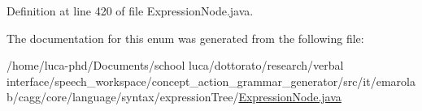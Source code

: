 Definition at line 420 of file Expression\-Node.\-java.



The documentation for this enum was generated from the following file\-:\begin{DoxyCompactItemize}
\item 
/home/luca-\/phd/\-Documents/school luca/dottorato/research/verbal interface/speech\-\_\-workspace/concept\-\_\-action\-\_\-grammar\-\_\-generator/src/it/emarolab/cagg/core/language/syntax/expression\-Tree/\hyperlink{ExpressionNode_8java}{Expression\-Node.\-java}\end{DoxyCompactItemize}

